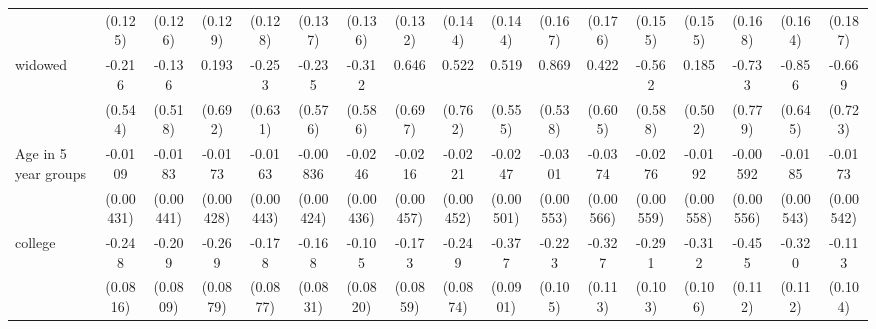 {\begin{tabular}{l*{16}{c}}
                    &     (0.125)         &     (0.126)         &     (0.129)         &     (0.128)         &     (0.137)         &     (0.136)         &     (0.132)         &     (0.144)         &     (0.144)         &     (0.167)         &     (0.176)         &     (0.155)         &     (0.155)         &     (0.168)         &     (0.164)         &     (0.187)         \\
[1em]
widowed             &      -0.216         &      -0.136         &       0.193         &      -0.253         &      -0.235         &      -0.312         &       0.646         &       0.522         &       0.519         &       0.869         &       0.422         &      -0.562         &       0.185         &      -0.733         &      -0.856         &      -0.669         \\
                    &     (0.544)         &     (0.518)         &     (0.692)         &     (0.631)         &     (0.576)         &     (0.586)         &     (0.697)         &     (0.762)         &     (0.555)         &     (0.538)         &     (0.605)         &     (0.588)         &     (0.502)         &     (0.779)         &     (0.645)         &     (0.723)         \\
[1em]
Age in 5 year groups&     -0.0109\sym{*}  &     -0.0183\sym{***}&     -0.0173\sym{***}&     -0.0163\sym{***}&    -0.00836\sym{*}  &     -0.0246\sym{***}&     -0.0216\sym{***}&     -0.0221\sym{***}&     -0.0247\sym{***}&     -0.0301\sym{***}&     -0.0374\sym{***}&     -0.0276\sym{***}&     -0.0192\sym{***}&    -0.00592         &     -0.0185\sym{***}&     -0.0173\sym{**} \\
                    &   (0.00431)         &   (0.00441)         &   (0.00428)         &   (0.00443)         &   (0.00424)         &   (0.00436)         &   (0.00457)         &   (0.00452)         &   (0.00501)         &   (0.00553)         &   (0.00566)         &   (0.00559)         &   (0.00558)         &   (0.00556)         &   (0.00543)         &   (0.00542)         \\
[1em]
college             &      -0.248\sym{**} &      -0.209\sym{**} &      -0.269\sym{**} &      -0.178\sym{*}  &      -0.168\sym{*}  &      -0.105         &      -0.173\sym{*}  &      -0.249\sym{**} &      -0.377\sym{***}&      -0.223\sym{*}  &      -0.327\sym{**} &      -0.291\sym{**} &      -0.312\sym{**} &      -0.455\sym{***}&      -0.320\sym{**} &      -0.113         \\
                    &    (0.0816)         &    (0.0809)         &    (0.0879)         &    (0.0877)         &    (0.0831)         &    (0.0820)         &    (0.0859)         &    (0.0874)         &    (0.0901)         &     (0.105)         &     (0.113)         &     (0.103)         &     (0.106)         &     (0.112)         &     (0.112)         &     (0.104)         \\

\end{tabular}}
